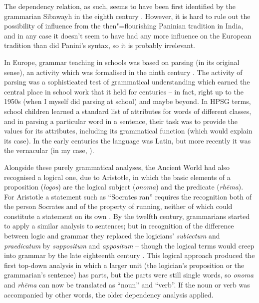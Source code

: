 \documentclass[output=paper
 	        ,biblatex
                ,babelshorthands
                ,newtxmath
                ,draftmode
                ,colorlinks, citecolor=brown
]{langscibook}
\begin{document}
The dependency relation, as such, seems to have been first identified by the  grammarian Sibawayh in the eighth century \citep{Owens1988,Kouloughli1999}. However, it is hard to rule out the possibility of influence from the then"=flourishing Paninian tradition in India, and in any case it doesn’t seem to have had any more influence on the European tradition than did Panini’s syntax, so it is probably irrelevant.

In Europe, grammar teaching in schools was based on parsing (in its original sense), an activity which was formalised in the ninth century \citep{Luhtala1994}. The activity of parsing was a sophisticated test of grammatical understanding which earned the central place in school work that it held for centuries – in fact, right up to the 1950s (when I myself did parsing at school) and maybe beyond. In HPSG terms, school children learned a standard list of attributes for words of different classes, and in parsing a particular word in a sentence, their task was to provide the values for its attributes, including its grammatical function (which would explain its case). In the early centuries the language was Latin, but more recently it was the vernacular (in my case, ).

Alongside these purely grammatical analyses, the Ancient World had also recognised a logical one, due to Aristotle, in which the basic elements of a proposition (\emph{logos}) are the logical subject (\emph{onoma}) and the predicate (\emph{rhēma}). For Aristotle a statement such as ``Socrates ran'' requires the recognition both of the person Socrates and of the property of running, neither of which could constitute a statement on its own \citep[30–31]{Law2003}. By the twelfth century, grammarians started to apply a similar analysis to sentences; but in recognition of the difference between logic and grammar they replaced the logicians’ \emph{subiectum} and \emph{praedicatum} by \emph{suppositum} and \emph{appositum} – though the logical terms would creep into grammar by the late eighteenth century \citep[168]{Law2003}. This logical approach produced the first top-down analysis in which a larger unit (the logician’s proposition or the grammarian’s sentence) has parts, but the parts were still single words, so \emph{onoma} and \emph{rhēma} can now be translated as ``noun'' and ``verb''. If the noun or verb was accompanied by other words, the older dependency analysis applied.
\end{document}
